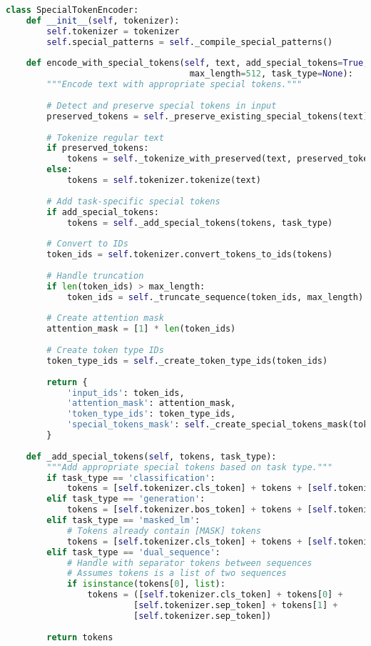 \begin{lstlisting}[language=Python, caption=Special token-aware encoding pipeline]
class SpecialTokenEncoder:
    def __init__(self, tokenizer):
        self.tokenizer = tokenizer
        self.special_patterns = self._compile_special_patterns()
        
    def encode_with_special_tokens(self, text, add_special_tokens=True,
                                    max_length=512, task_type=None):
        """Encode text with appropriate special tokens."""
        
        # Detect and preserve special tokens in input
        preserved_tokens = self._preserve_existing_special_tokens(text)
        
        # Tokenize regular text
        if preserved_tokens:
            tokens = self._tokenize_with_preserved(text, preserved_tokens)
        else:
            tokens = self.tokenizer.tokenize(text)
            
        # Add task-specific special tokens
        if add_special_tokens:
            tokens = self._add_special_tokens(tokens, task_type)
            
        # Convert to IDs
        token_ids = self.tokenizer.convert_tokens_to_ids(tokens)
        
        # Handle truncation
        if len(token_ids) > max_length:
            token_ids = self._truncate_sequence(token_ids, max_length)
            
        # Create attention mask
        attention_mask = [1] * len(token_ids)
        
        # Create token type IDs
        token_type_ids = self._create_token_type_ids(token_ids)
        
        return {
            'input_ids': token_ids,
            'attention_mask': attention_mask,
            'token_type_ids': token_type_ids,
            'special_tokens_mask': self._create_special_tokens_mask(token_ids)
        }
        
    def _add_special_tokens(self, tokens, task_type):
        """Add appropriate special tokens based on task type."""
        if task_type == 'classification':
            tokens = [self.tokenizer.cls_token] + tokens + [self.tokenizer.sep_token]
        elif task_type == 'generation':
            tokens = [self.tokenizer.bos_token] + tokens + [self.tokenizer.eos_token]
        elif task_type == 'masked_lm':
            # Tokens already contain [MASK] tokens
            tokens = [self.tokenizer.cls_token] + tokens + [self.tokenizer.sep_token]
        elif task_type == 'dual_sequence':
            # Handle with separator tokens between sequences
            # Assumes tokens is a list of two sequences
            if isinstance(tokens[0], list):
                tokens = ([self.tokenizer.cls_token] + tokens[0] +
                         [self.tokenizer.sep_token] + tokens[1] +
                         [self.tokenizer.sep_token])
        
        return tokens
\end{lstlisting}

